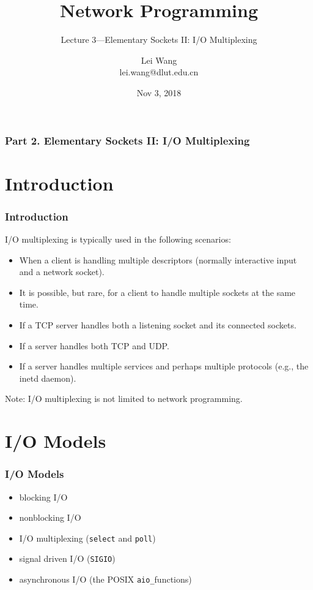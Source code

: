 \documentclass[notes,serif]{beamer}
\title{Network Programming}
\subtitle{Lecture 3---Elementary Sockets II: I/O Multiplexing}
\author{Lei Wang\\ lei.wang@dlut.edu.cn}
\institute{Dalian University of Technology}
\date{Nov 3, 2018}
\begin{document}
\begin{frame}
  \titlepage
\end{frame}

\begin{frame}
  \frametitle{Part 2. Elementary Sockets II: I/O Multiplexing}
  \tableofcontents
\end{frame}

\section{Introduction}

\begin{frame}
\frametitle{Introduction}

I/O multiplexing is typically used in the following scenarios:
\begin{itemize}
  \item When a client is handling multiple descriptors (normally interactive input and a network socket).
  \item It is possible, but rare, for a client to handle multiple sockets at the same time.
  \item If a TCP server handles both a listening socket and its connected sockets.
  \item If a server handles both TCP and UDP.
  \item If a server handles multiple services and perhaps multiple protocols (e.g., the inetd daemon).
\end{itemize}
Note: I/O multiplexing is not limited to network programming.
\end{frame}

\section{I/O Models}
\begin{frame}
\frametitle{I/O Models}
\begin{itemize}
  \item blocking I/O
  \item nonblocking I/O
  \item I/O multiplexing (\texttt{select} and \texttt{poll})
  \item signal driven I/O (\texttt{SIGIO})
  \item asynchronous I/O (the POSIX \texttt{aio\_}functions)
\end{itemize}
\end{frame}
\end{document}
